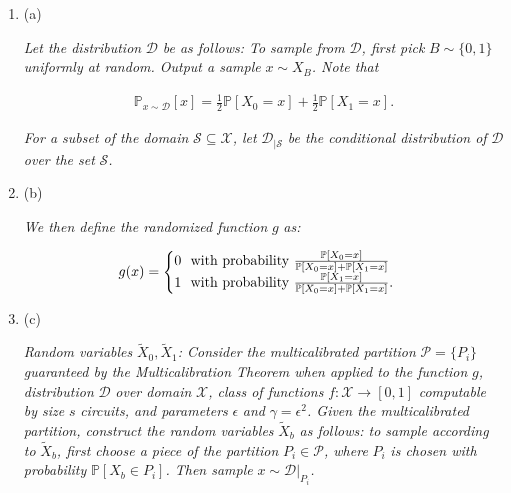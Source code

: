 \begin{enumerate}


\item[] 
(a) 


\emph{Let the distribution }$\mathcal{D}$\emph{ be as follows: To sample from }$\mathcal{D}$\emph{, first pick }$B\sim\{0,1\}$\emph{ uniformly at random. Output a sample }$x\sim X_{B}$\emph{. Note that}\par


\[\begin{gathered}
\mathbb{P}_{x\sim\mathcal{D}}[x]=\frac{1}{2}\mathbb{P}[X_{0}=x]+\frac{1}{2}\mathbb{P}[X_{1}=x].
\end{gathered}\]




\emph{For a subset of the domain }$\mathcal{S}\subseteq\mathcal{X}$\emph{, let }$\mathcal{D}_{|\mathcal{S}}$\emph{ be the conditional distribution of }$\mathcal{D}$\emph{ over the set }$\mathcal{S}$\emph{.}\par





\item[] 
(b) 


\emph{We then define the randomized function }$g$\emph{ as:}\par


\[\begin{gathered}
g(x)=\begin{cases}0\nobreak\ \nobreak\ \text{with probability }\frac{\mathbb{P}[X_{0}=x]}{\mathbb{P}[X_{0}=x]+\mathbb{P}[X_{1}=x]}\\
1\nobreak\ \nobreak\ \text{with probability }\frac{\mathbb{P}[X_{1}=x]}{\mathbb{P}[X_{0}=x]+\mathbb{P}[X_{1}=x]}.\end{cases}
\end{gathered}\]





\item[] 
(c) 


\emph{Random variables }$\widetilde{X}_{0},\widetilde{X}_{1}$\emph{: Consider the multicalibrated partition }$\mathcal{P}=\{P_{i}\}$\emph{ guaranteed by the Multicalibration Theorem when applied to the function }$g$\emph{, distribution }$\mathcal{D}$\emph{ over domain }$\mathcal{X}$\emph{, class of functions }$f:\mathcal{X}\to[0,1]$\emph{ computable by size }$s$\emph{ circuits, and parameters }$\epsilon$\emph{ and }$\gamma=\epsilon^{2}$\emph{. Given the multicalibrated partition, construct the random variables }$\widetilde{X}_{b}$\emph{ as follows: to sample according to }$\widetilde{X}_{b}$\emph{, first choose a piece of the partition }$P_{i}\in\mathcal{P}$\emph{, where }$P_{i}$\emph{ is chosen with probability }$\mathbb{P}[X_{b}\in P_{i}]$\emph{. Then sample }$x\sim\mathcal{D}|_{P_{i}}$\emph{.}\par





\end{enumerate}



